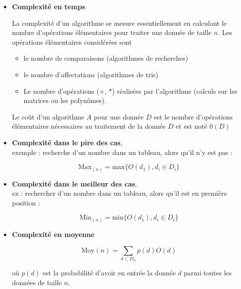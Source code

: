 

\begin{itemize} 
   \item  {\bf Complexit\'e en temps}

     La complexit\'e d'un algorithme se mesure essentiellement en
     calculant le nombre d'op\'erations \'el\'ementaires pour traiter une
     donn\'ee de taille $n$. Les op\'erations \'el\'ementaires consid\'er\'ees sont

     \begin{itemize} 
        \item  le nombre de comparaisons (algorithmes de recherches)
        \item  le nombre d'affectations (algorithmes de tris)
        \item  Le nombre d'op\'erations ($+$, $*$) r\'ealis\'ees par l'algorithme
		(calculs sur les matrices ou les polyn\^omes).
     \end{itemize} 
     Le co\^ut d'un algorithme $A$ pour une donn\'ee $D$ est le nombre
     d'op\'erations \'el\'ementaires n\'ecessaires au traitement de la donn\'ee $D$
     et est not\'e $0(D)$

   \item  {\bf Complexit\'e dans le pire des cas},\\exemple :
          recherche d'un nombre dans un tableau, alors qu'il n'y est pas : 

			  \[ \mbox{Max}_{(n)} = \mbox{max}\{O(d_{1}), d_{i}\in D_{i} \}\]

   \item  {\bf Complexit\'e dans le meilleur des cas},\\ex :
           rechercher d'un nombre
		  dans un tableau, alors qu'il est en premi\`ere position :

		  \[ \mbox{Min}_{(n)} = \mbox{min}\{O(d_{1}), d_{i}\in D_{i}\} \]

   \item  {\bf Complexit\'e en moyenne}

          \[ \mbox{Moy}(n) = \sum_{d \subset D_{n}} p(d) O(d) \]

     o\`u $p(d)$ est la probabilit\'e d'avoir en entr\'ee la donn\'ee $d$ parmi toutes
     les donn\'ees de taille $n$. 


\end{itemize}
